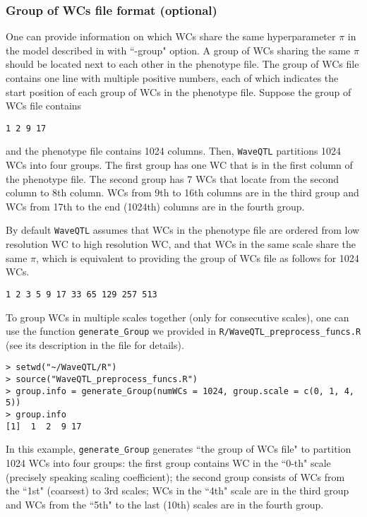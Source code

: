 \documentclass[11pt]{article}
\begin{document}
\subsubsection{Group of WCs file format (optional)}\label{group WCs file}
One can provide information on which WCs share the same hyperparameter $\pi$ in the model described in \cite{Shim2014} with ``-group" option. A group of WCs sharing the same $\pi$ should be located next to each other in the phenotype file. The group of WCs file contains one line with multiple positive numbers, each of which indicates the start position of each group of WCs in the phenotype file. Suppose the group of WCs file contains 
\begin{verbatim}
1 2 9 17
\end{verbatim}
and the phenotype file contains 1024 columns. Then, {\tt WaveQTL} partitions 1024 WCs into four groups. The first group has one WC that is in the first column of the phenotype file.
The second group has 7 WCs that locate from the second column to 8th column. WCs from 9th to 16th columns are in the third group and WCs from 17th to the end (1024th) columns are in the fourth group.

By default {\tt WaveQTL} assumes that WCs in the phenotype file are ordered from low resolution WC to high resolution WC, and that WCs in the same scale share the same $\pi$, which is equivalent to providing the group of WCs file as follows for 1024 WCs. 
\begin{verbatim}
1 2 3 5 9 17 33 65 129 257 513
\end{verbatim}

To group WCs in multiple scales together (only for consecutive scales), one can use the function {\tt generate\_Group} we provided in {\tt R/WaveQTL\_preprocess\_funcs.R} (see its description in the file for details). 
\begin{verbatim}
> setwd("~/WaveQTL/R")
> source("WaveQTL_preprocess_funcs.R")
> group.info = generate_Group(numWCs = 1024, group.scale = c(0, 1, 4, 5))
> group.info
[1]  1  2  9 17
\end{verbatim}
In this example, {\tt generate\_Group} generates ``the group of WCs file" to partition 1024 WCs into four groups: the first group contains WC in the ``0-th" scale (precisely speaking scaling coefficient); the second group consists of WCs from the ``1st" (coarsest) to 3rd scales; WCs in the ``4th" scale are in the third group and WCs from the ``5th" to the last (10th) scales are in the fourth group. 
\end{document}
